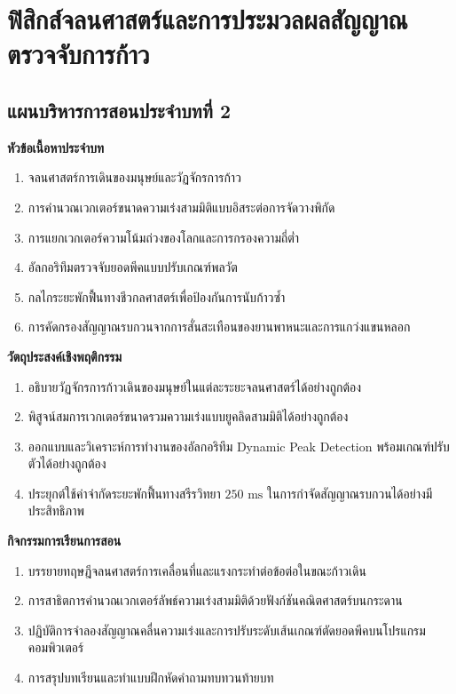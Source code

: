 \chapter{ฟิสิกส์จลนศาสตร์และการประมวลผลสัญญาณตรวจจับการก้าว}
\label{chap:ch02}

\section*{แผนบริหารการสอนประจำบทที่ 2}

\noindent\textbf{หัวข้อเนื้อหาประจำบท}
\begin{enumerate}
    \item จลนศาสตร์การเดินของมนุษย์และวัฏจักรการก้าว
    \item การคำนวณเวกเตอร์ขนาดความเร่งสามมิติแบบอิสระต่อการจัดวางพิกัด
    \item การแยกเวกเตอร์ความโน้มถ่วงของโลกและการกรองความถี่ต่ำ
    \item อัลกอริทึมตรวจจับยอดพีคแบบปรับเกณฑ์พลวัต
    \item กลไกระยะพักฟื้นทางชีวกลศาสตร์เพื่อป้องกันการนับก้าวซ้ำ
    \item การคัดกรองสัญญาณรบกวนจากการสั่นสะเทือนของยานพาหนะและการแกว่งแขนหลอก
\end{enumerate}

\noindent\textbf{วัตถุประสงค์เชิงพฤติกรรม}
\begin{enumerate}
    \item อธิบายวัฏจักรการก้าวเดินของมนุษย์ในแต่ละระยะจลนศาสตร์ได้อย่างถูกต้อง
    \item พิสูจน์สมการเวกเตอร์ขนาดรวมความเร่งแบบยูคลิดสามมิติได้อย่างถูกต้อง
    \item ออกแบบและวิเคราะห์การทำงานของอัลกอริทึม Dynamic Peak Detection พร้อมเกณฑ์ปรับตัวได้อย่างถูกต้อง
    \item ประยุกต์ใช้ค่าจำกัดระยะพักฟื้นทางสรีรวิทยา $250\text{ ms}$ ในการกำจัดสัญญาณรบกวนได้อย่างมีประสิทธิภาพ
\end{enumerate}

\noindent\textbf{กิจกรรมการเรียนการสอน}
\begin{enumerate}
    \item บรรยายทฤษฎีจลนศาสตร์การเคลื่อนที่และแรงกระทำต่อข้อต่อในขณะก้าวเดิน
    \item การสาธิตการคำนวณเวกเตอร์ลัพธ์ความเร่งสามมิติด้วยฟังก์ชันคณิตศาสตร์บนกระดาน
    \item ปฏิบัติการจำลองสัญญาณคลื่นความเร่งและการปรับระดับเส้นเกณฑ์ตัดยอดพีคบนโปรแกรมคอมพิวเตอร์
    \item การสรุปบทเรียนและทำแบบฝึกหัดคำถามทบทวนท้ายบท
\end{enumerate}

